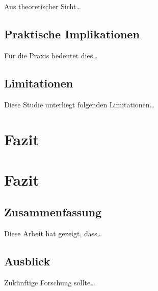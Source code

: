 \documentclass[12pt, a4paper, twoside, openright]{report}
\begin{document}
Aus theoretischer Sicht\ldots{}

\section{Praktische Implikationen}\label{praktische-implikationen}

Für die Praxis bedeutet dies\ldots{}

\section{Limitationen}\label{limitationen}

Diese Studie unterliegt folgenden Limitationen\ldots{}


\chapter{Fazit}\label{fazit}


\chapter{Fazit}\label{fazit-1}

\section{Zusammenfassung}\label{zusammenfassung}

Diese Arbeit hat gezeigt, dass\ldots{}

\section{Ausblick}\label{ausblick}

Zukünftige Forschung sollte\ldots{}
\end{document}
